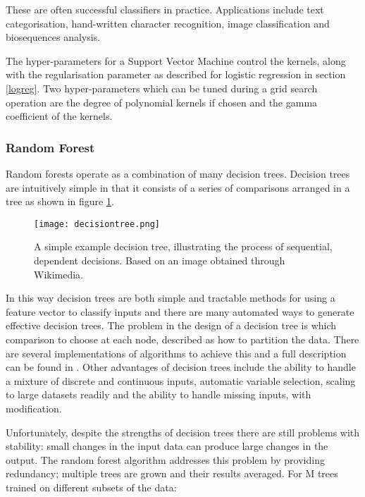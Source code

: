 These are often successful classifiers in practice.
Applications include text categorisation, hand-written character recognition, image classification and biosequences analysis\autocite{cristianini_introduction_2000}.

The hyper-parameters for a Support Vector Machine control the kernels, along with the regularisation parameter as described for logistic regression in section \ref{logreg}.
Two hyper-parameters which can be tuned during a grid search operation are the degree of polynomial kernels if chosen and the gamma coefficient of the kernels.


\subsubsection*{Random Forest}
\label{randomforest}

Random forests operate as a combination of many decision trees.
Decision trees are intuitively simple in that it consists of a series of comparisons arranged in a tree as shown in figure \ref{fig:dectree}.

\begin{figure}
    \centering
    \texttt{[image: decisiontree.png]}
    \caption{A simple example decision tree, illustrating the process of sequential, dependent decisions. Based on an image obtained through Wikimedia\autocite{wkmdacommons}.}
    \label{fig:dectree}
\end{figure}

In this way decision trees are both simple and tractable methods for using a feature vector to classify inputs and there are many automated ways to generate effective decision trees.
The problem in the design of a decision tree is which comparison to choose at each node, described as how to partition the data\autocite[544]{murphy_machine_2012}. %
There are several implementations of algorithms to achieve this and a full description can be found in \textcite[544]{murphy_machine_2012}.
Other advantages of decision trees include the ability to handle a mixture of discrete and continuous inputs, automatic variable selection, scaling to large datasets readily and the ability to handle missing inputs, with modification.


Unfortunately, despite the strengths of decision trees there are still problems with stability: small changes in the input data can produce large changes in the output\autocite[550]{murphy_machine_2012}.
The random forest algorithm addresses this problem by providing redundancy; multiple trees are grown and their results averaged.
For M trees trained on different subsets of the data\autocite[551]{murphy_machine_2012}:

